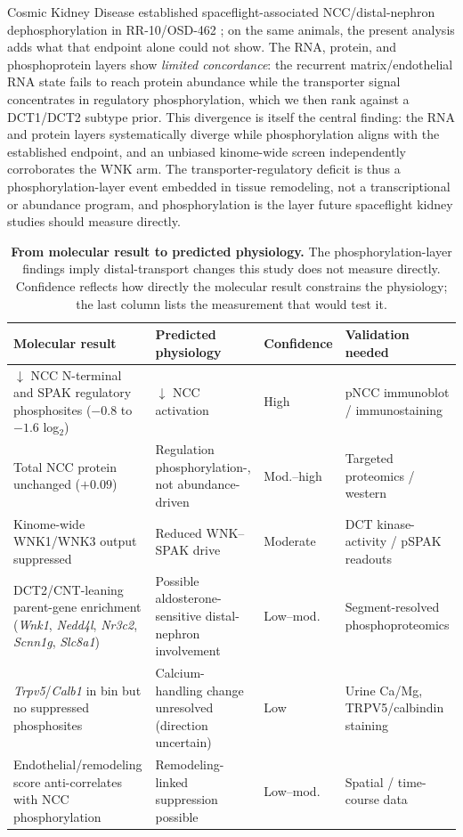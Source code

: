 \documentclass[11pt]{article}
\newcommand{\gene}[1]{\textit{#1}}
\begin{document}
Cosmic Kidney Disease established spaceflight-associated NCC/distal-nephron dephosphorylation in RR-10/OSD-462 \citep{siew2024cosmic}; on the same animals, the present analysis adds what that endpoint alone could not show. The RNA, protein, and phosphoprotein layers show \emph{limited concordance}: the recurrent matrix/endothelial RNA state fails to reach protein abundance while the transporter signal concentrates in regulatory phosphorylation, which we then rank against a DCT1/DCT2 subtype prior. This divergence is itself the central finding: the RNA and protein layers systematically diverge while phosphorylation aligns with the established endpoint, and an unbiased kinome-wide screen independently corroborates the WNK arm. The transporter-regulatory deficit is thus a phosphorylation-layer event embedded in tissue remodeling, not a transcriptional or abundance program, and phosphorylation is the layer future spaceflight kidney studies should measure directly.

\begin{table}[H]
\centering\small
\caption{\textbf{From molecular result to predicted physiology.} The phosphorylation-layer findings imply distal-transport changes this study does not measure directly. Confidence reflects how directly the molecular result constrains the physiology; the last column lists the measurement that would test it.}
\label{tab:physpred}
\begin{tabularx}{\textwidth}{@{}YYlY@{}}
\toprule
Molecular result & Predicted physiology & Confidence & Validation needed \\
\midrule
$\downarrow$ NCC N-terminal and SPAK regulatory phosphosites ($-0.8$ to $-1.6$ log$_2$) & $\downarrow$ NCC activation & High & pNCC immunoblot / immunostaining \\
Total NCC protein unchanged ($+0.09$) & Regulation phosphorylation-, not abundance-driven & Mod.--high & Targeted proteomics / western \\
Kinome-wide WNK1/WNK3 output suppressed & Reduced WNK--SPAK drive & Moderate & DCT kinase-activity / pSPAK readouts \\
DCT2/CNT-leaning parent-gene enrichment (\gene{Wnk1}, \gene{Nedd4l}, \gene{Nr3c2}, \gene{Scnn1g}, \gene{Slc8a1}) & Possible aldosterone-sensitive distal-nephron involvement & Low--mod. & Segment-resolved phosphoproteomics \\
\gene{Trpv5}/\gene{Calb1} in bin but no suppressed phosphosites & Calcium-handling change unresolved (direction uncertain) & Low & Urine Ca/Mg, TRPV5/calbindin staining \\
Endothelial/remodeling score anti-correlates with NCC phosphorylation & Remodeling-linked suppression possible & Low--mod. & Spatial / time-course data \\
\bottomrule
\end{tabularx}
\end{table}
\end{document}
